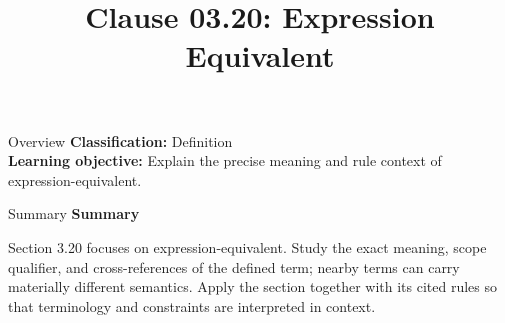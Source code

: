 \documentclass[10pt,letterpaper]{article}
\title{Clause 03.20: Expression Equivalent}
\author{}
\date{}
\begin{document}
\maketitle
\begin{CornellOverviewBox}{Overview}
\textbf{Classification:} Definition\\[2pt]
\textbf{Learning objective:} Explain the precise meaning and rule context of expression-equivalent.
\end{CornellOverviewBox}\begin{CornellSummaryBox}{Summary}
{\sffamily\bfseries\color{Accent} Summary}\par\vspace{3pt}Section 3.20 focuses on expression-equivalent. Study the exact meaning, scope qualifier, and cross-references of the defined term; nearby terms can carry materially different semantics. Apply the section together with its cited rules so that terminology and constraints are interpreted in context.
\end{CornellSummaryBox}
\end{document}
